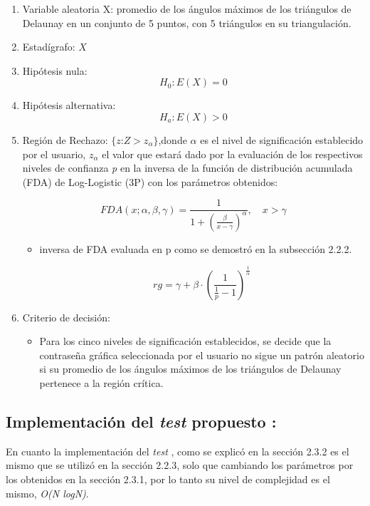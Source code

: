 \documentclass[12pt]{report}
\begin{document}
\begin{enumerate}
	\item Variable aleatoria X: promedio de los ángulos máximos de los triángulos de Delaunay en un conjunto de 5 puntos, con 5 triángulos en su triangulación.
	\item Estadígrafo: $X$
	
	\item Hipótesis nula: \[H_0:E(X)=0\]
	
	
	\item Hipótesis alternativa: \[H_a:E(X)>0\]
	
	\item  Región de Rechazo: $\{z$:$Z>z_\alpha\}$,donde $\alpha$ es el nivel de significación establecido por el usuario,  $z_\alpha$  el valor que estará dado por la evaluación de los respectivos niveles de confianza \textit{p} en la  inversa de la función de distribución acumulada (FDA) de Log-Logistic (3P) con los parámetros obtenidos: 
	
	\[
	FDA(x; \alpha, \beta, \gamma) = \frac{1}{1 + \left( \frac{\beta}{x - \gamma} \right)^\alpha}, \quad x > \gamma
	\]
	\begin{itemize}
		\item inversa de FDA evaluada en p como se demostró en la subsección 2.2.2.
		
	
		\[
		rg = \gamma + \beta \cdot \left( \frac{1}{\frac{1}{p}-1} \right)^{\frac{1}{\alpha}}
		\]
		
	\end{itemize}
	\item Criterio de decisión:
	\begin{itemize}
		\item Para los cinco niveles de significación establecidos, se decide que la contraseña gráfica seleccionada por el usuario no sigue un patrón aleatorio si su promedio de los ángulos máximos de los triángulos de Delaunay  pertenece a la región crítica. 
	\end{itemize}
\end{enumerate}
\subsection{Implementación del \textit{test} propuesto :}
En cuanto  la implementación del \textit{test} , como se explicó en la sección 2.3.2 es el mismo que se utilizó en la sección 2.2.3, solo que cambiando los parámetros por los obtenidos en la sección 2.3.1, por lo tanto su nivel de complejidad es el mismo, \textit{O(N logN)}.
\end{document}
